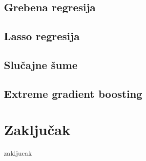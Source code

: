 \documentclass[a4paper]{article}
\begin{document}
\subsection{Grebena regresija}
\label{sec:ridge_1}

\subsection{Lasso regresija}
\label{sec:lasso_1}

\subsection{Slučajne šume}
\label{sec:randomForest_1}

\subsection{Extreme gradient boosting}
\label{sec:xgBoost_1}

\pagebreak

\section{Zaključak}
\label{sec:zakljucak}
zakljucak


\pagebreak

\appendix


\appendix
\end{document}
